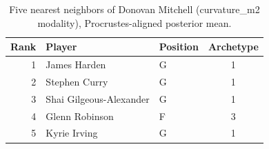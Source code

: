\begin{table}[htbp]
  \centering\small
  \begin{tabular}{rllc}
    \toprule
    Rank & Player & Position & Archetype \\
    \midrule
    1 & James Harden & G & 1 \\
    2 & Stephen Curry & G & 1 \\
    3 & Shai Gilgeous-Alexander & G & 1 \\
    4 & Glenn Robinson & F & 3 \\
    5 & Kyrie Irving & G & 1 \\
    \bottomrule
  \end{tabular}
  \caption{Five nearest neighbors of Donovan Mitchell (curvature_m2 modality), Procrustes-aligned posterior mean.}
  \label{tab:Donovan_Mitchell_neighbors_curvature_m2}
\end{table}

